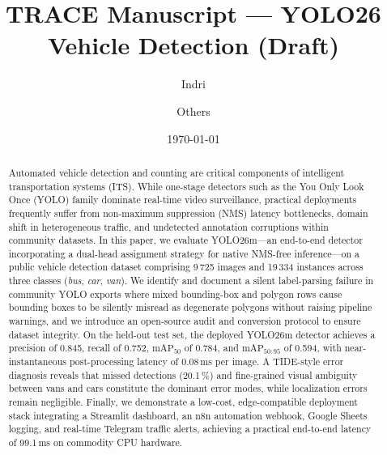 \documentclass[10pt,twocolumn,letterpaper]{article}
\title{TRACE Manuscript — YOLO26 Vehicle Detection (Draft)}
\author{Indri \and Others}
\date{\today}
\begin{document}
\maketitle

\begin{abstract}
Automated vehicle detection and counting are critical components of intelligent transportation systems (ITS). While one-stage detectors such as the You Only Look Once (YOLO) family dominate real-time video surveillance, practical deployments frequently suffer from non-maximum suppression (NMS) latency bottlenecks, domain shift in heterogeneous traffic, and undetected annotation corruptions within community datasets. In this paper, we evaluate YOLO26m---an end-to-end detector incorporating a dual-head assignment strategy for native NMS-free inference---on a public vehicle detection dataset comprising 9\,725 images and 19\,334 instances across three classes (\textit{bus}, \textit{car}, \textit{van}). We identify and document a silent label-parsing failure in community YOLO exports where mixed bounding-box and polygon rows cause bounding boxes to be silently misread as degenerate polygons without raising pipeline warnings, and we introduce an open-source audit and conversion protocol to ensure dataset integrity. On the held-out test set, the deployed YOLO26m detector achieves a precision of 0.845, recall of 0.752, $\text{mAP}_{50}$ of 0.784, and $\text{mAP}_{50:95}$ of 0.594, with near-instantaneous post-processing latency of 0.08\,ms per image. A TIDE-style error diagnosis reveals that missed detections (20.1\,\%) and fine-grained visual ambiguity between vans and cars constitute the dominant error modes, while localization errors remain negligible. Finally, we demonstrate a low-cost, edge-compatible deployment stack integrating a Streamlit dashboard, an n8n automation webhook, Google Sheets logging, and real-time Telegram traffic alerts, achieving a practical end-to-end latency of 99.1\,ms on commodity CPU hardware.
\end{abstract}











\end{document}
